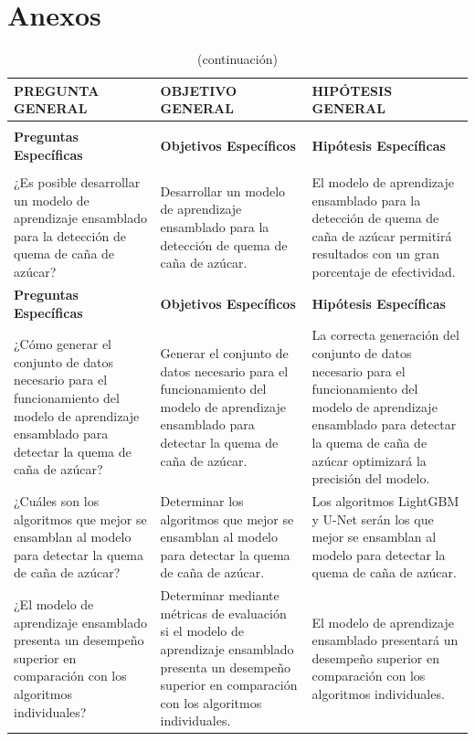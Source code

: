 \clearpage
\section{Anexos}
\begin{longtable}{>{\raggedright\arraybackslash}p{5cm}>{\raggedright\arraybackslash}p{5cm}>{\raggedright\arraybackslash}p{5cm}}
    \caption{Matriz de consistencia.} \label{tab:preguntas_objetivos_hipotesis} \\
    \hline
    \textbf{PREGUNTA GENERAL} & \textbf{OBJETIVO GENERAL} & \textbf{HIPÓTESIS GENERAL} \\
    \hline
    \endfirsthead 
    \caption[]{(continuación)} \\
    \hline
    \textbf{Preguntas Específicas} & \textbf{Objetivos Específicos} & \textbf{Hipótesis Específicas} \\
    \hline
    \endhead
    \hline
    \multicolumn{3}{r}{\textit{Continúa en la siguiente página ...}} \\
    \endfoot
    \hline
    \endlastfoot
    ¿Es posible desarrollar un modelo de aprendizaje ensamblado para la detección de quema de caña de azúcar? & Desarrollar un modelo de aprendizaje ensamblado para la detección de quema de caña de azúcar. & El modelo de aprendizaje ensamblado para la detección de quema de caña de azúcar permitirá resultados con un gran porcentaje de efectividad. \\
    \hline
    \textbf{Preguntas Específicas} & \textbf{Objetivos Específicos} & \textbf{Hipótesis Específicas} \\
    \hline
    ¿Cómo generar el conjunto de datos necesario para el funcionamiento del modelo de aprendizaje ensamblado para detectar la quema de caña de azúcar? & Generar el conjunto de datos necesario para el funcionamiento del modelo de aprendizaje ensamblado para detectar la quema de caña de azúcar. & La correcta generación del conjunto de datos necesario para el funcionamiento del modelo de aprendizaje ensamblado para detectar la quema de caña de azúcar optimizará la precisión del modelo. \\
    ¿Cuáles son los algoritmos que mejor se ensamblan al modelo para detectar la quema de caña de azúcar? & Determinar los algoritmos que mejor se ensamblan al modelo para detectar la quema de caña de azúcar. & Los algoritmos LightGBM y U-Net serán los que mejor se ensamblan al modelo para detectar la quema de caña de azúcar. \\
    ¿El modelo de aprendizaje ensamblado presenta un desempeño superior en comparación con los algoritmos individuales? & Determinar mediante métricas de evaluación si el modelo de aprendizaje ensamblado presenta un desempeño superior en comparación con los algoritmos individuales. & El modelo de aprendizaje ensamblado presentará un desempeño superior en comparación con los algoritmos individuales. \\
    \hline
\end{longtable}

